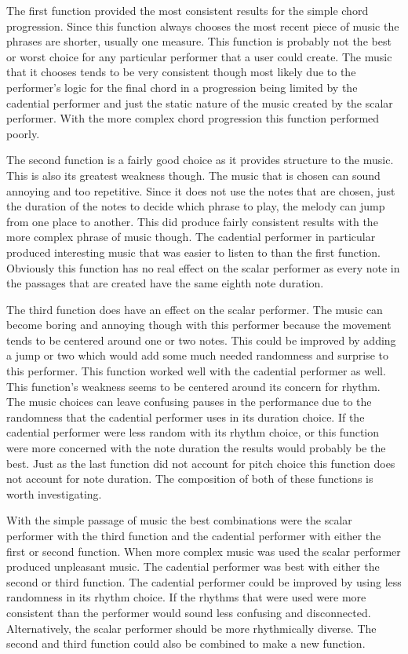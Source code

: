 \documentclass[12pt]{ucthesis}
\begin{document}
The first function provided the most consistent results for the simple chord progression. Since this function always chooses the most recent piece of music the phrases are shorter, usually one measure. This function is probably not the best or worst choice for any particular performer that a user could create. The music that it chooses tends to be very consistent though most likely due to the performer's logic for the final chord in a progression being limited by the cadential performer and just the static nature of the music created by the scalar performer.  With the more complex chord progression this function performed poorly.

The second function is a fairly good choice as it provides structure to the music. This is also its greatest weakness though. The music that is chosen can sound annoying and too repetitive. Since it does not use the notes that are chosen, just the duration of the notes to decide which phrase to play, the melody can jump from one place to another. This did produce fairly consistent results with the more complex phrase of music though. The cadential performer in particular produced interesting music that was easier to listen to than the first function. Obviously this function has no real effect on the scalar performer as every note in the passages that are created have the same eighth note duration.

The third function does have an effect on the scalar performer. The music can become boring and annoying though with this performer because the movement tends to be centered around one or two notes. This could be improved by adding a jump or two which would add some much needed randomness and surprise to this performer. This function worked well with the cadential performer as well. This function's weakness seems to be centered around its concern for rhythm. The music choices can leave confusing pauses in the performance due to the randomness that the cadential performer uses in its duration choice. If the cadential performer were less random with its rhythm choice, or this function were more concerned with the note duration the results would probably be the best. Just as the last function did not account for pitch choice this function does not account for note duration. The composition of both of these functions is worth investigating. 

With the simple passage of music the best combinations were the scalar performer with the third function and the cadential performer with either the first or second function. When more complex music was used the scalar performer produced unpleasant music. The cadential performer was best with either the second or third function. The cadential performer could be improved by using less randomness in its rhythm choice. If the rhythms that were used were more consistent than the performer would sound less confusing and disconnected. Alternatively, the scalar performer should be more rhythmically diverse. The second and third function could also be combined to make a new function. 
\end{document}
